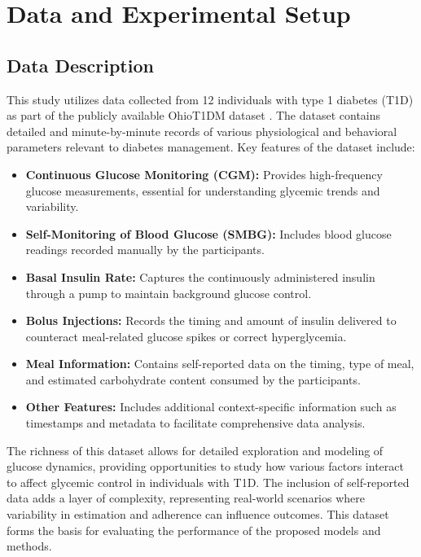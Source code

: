
\section{Data and Experimental Setup}

\subsection{Data Description}
This study utilizes data collected from 12 individuals with type 1 diabetes (T1D) as part of the publicly available OhioT1DM dataset \cite{ohioT1DM_dataset}. The dataset contains detailed and minute-by-minute records of various physiological and behavioral parameters relevant to diabetes management. Key features of the dataset include:

\begin{itemize}
	\item \textbf{Continuous Glucose Monitoring (CGM):} Provides high-frequency glucose measurements, essential for understanding glycemic trends and variability.
	\item \textbf{Self-Monitoring of Blood Glucose (SMBG):} Includes blood glucose readings recorded manually by the participants.
	\item \textbf{Basal Insulin Rate:} Captures the continuously administered insulin through a pump to maintain background glucose control.
	\item \textbf{Bolus Injections:} Records the timing and amount of insulin delivered to counteract meal-related glucose spikes or correct hyperglycemia.
	\item \textbf{Meal Information:} Contains self-reported data on the timing, type of meal, and estimated carbohydrate content consumed by the participants.
	\item \textbf{Other Features:} Includes additional context-specific information such as timestamps and metadata to facilitate comprehensive data analysis.
\end{itemize}

The richness of this dataset allows for detailed exploration and modeling of glucose dynamics, providing opportunities to study how various factors interact to affect glycemic control in individuals with T1D. The inclusion of self-reported data adds a layer of complexity, representing real-world scenarios where variability in estimation and adherence can influence outcomes. This dataset forms the basis for evaluating the performance of the proposed models and methods.

